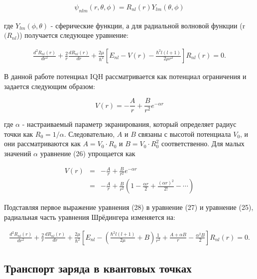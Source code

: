 \documentclass[a4paper,14pt]{extarticle}
\begin{document}
\begin{eqnarray}
    \psi_{nlm}(r, \theta, \phi) = R_{nl}(r) Y_{lm}(\theta, \phi)
    \end{eqnarray}

где $Y_{lm}(\phi, \theta)$ - сферические функции, а для радиальной волновой функции (r $(R_{nl}$)) получается следующее уравнение:

\begin{eqnarray}
    \frac{d^2 R_{nl}(r)}{dr^2} + \frac{2}{r} \frac{dR_{nl}(r)}{dr} + \frac{2\mu}{\hbar^2} \left[ E_{nl} - V(r) - \frac{\hbar^2 l(l+1)}{2\mu r^2} \right] R_{nl}(r) = 0.
    \end{eqnarray}
    
В данной работе потенциал IQH рассматривается как потенциал ограничения и задается следующим образом:

\begin{equation}
    V(r) = -\frac{A}{r} + \frac{B}{r^2} e^{-\alpha r}
    \end{equation}

где $\alpha$ - настраиваемый параметр экранирования, который определяет радиус точки как $R_0 = 1/\alpha$. Следовательно, $A$ и $B$ связаны с высотой потенциала $V_0$, и они рассматриваются как $A = V_0 \cdot R_0$ и $B = V_0 \cdot R_0^2$ соответственно. Для малых значений $\alpha$ уравнение (26) упрощается как

\begin{eqnarray}
    V(r) &=& -\frac{A}{r} + \frac{B}{r^2} e^{-\alpha r} \\
    &=& -\frac{A}{r} + \frac{B}{r^2} \left(1 - \frac{\alpha r}{2} + \frac{(\alpha r)^2}{2!} - \cdots \right)
    \end{eqnarray}

Подставляя первое выражение уравнения (28) в уравнение (27) и уравнение (25), радиальная часть уравнения Шрёдингера изменяется на:\cite{mantashyan}

\begin{eqnarray}
    \frac{d^2 R_{nl}(r)}{dr^2} + \frac{2}{r} \frac{dR_{nl}(r)}{dr} + \frac{2\mu}{\hbar^2} \left[ E_{nl} - \left( \frac{\hbar^2 l(l+1)}{2\mu} + B \right) \frac{1}{r^2} + \frac{A + \alpha B}{r} - \frac{\alpha^2 B}{2} \right] R_{nl}(r) = 0.
    \end{eqnarray}
    
\subsection{Транспорт заряда в квантовых точках}
\end{document}
